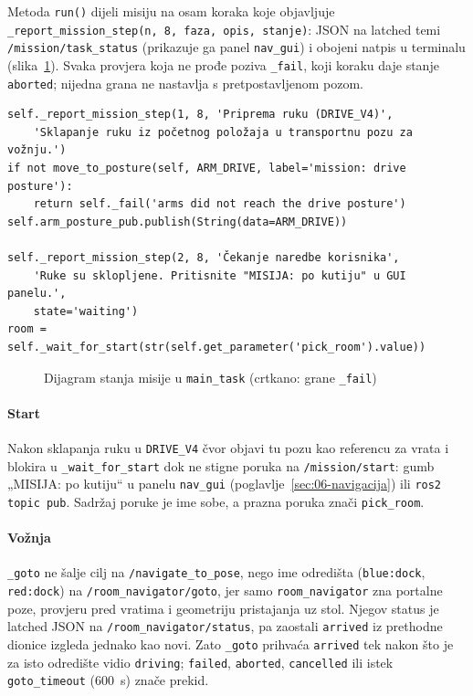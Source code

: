 Metoda \texttt{run()} dijeli misiju na osam koraka koje objavljuje \texttt{\_report\_mission\_step(n, 8,
faza, opis, stanje)}: JSON na latched temi \texttt{/mission/task\_status} (prikazuje ga panel
\texttt{nav\_gui}) i obojeni natpis u terminalu (slika~\ref{fig:mis-stanja}). Svaka provjera koja ne
prođe poziva \texttt{\_fail}, koji koraku daje stanje \texttt{aborted}; nijedna grana ne nastavlja s
pretpostavljenom pozom.

\begin{lstlisting}[style=code-python, caption={Prva dva od osam misijskih koraka (\texttt{main\_task.py}, redci 2915--2924): sklapanje ruku pa čekanje korisnika}, label={lst:misija-slijed}]
self._report_mission_step(1, 8, 'Priprema ruku (DRIVE_V4)',
    'Sklapanje ruku iz početnog položaja u transportnu pozu za vožnju.')
if not move_to_posture(self, ARM_DRIVE, label='mission: drive posture'):
    return self._fail('arms did not reach the drive posture')
self.arm_posture_pub.publish(String(data=ARM_DRIVE))

self._report_mission_step(2, 8, 'Čekanje naredbe korisnika',
    'Ruke su sklopljene. Pritisnite "MISIJA: po kutiju" u GUI panelu.',
    state='waiting')
room = self._wait_for_start(str(self.get_parameter('pick_room').value))
\end{lstlisting}

\begin{figure}[H]
  \centering
  
  \caption{Dijagram stanja misije u \texttt{main\_task} (crtkano: grane \texttt{\_fail})}
  \label{fig:mis-stanja}
\end{figure}

\paragraph{Start} Nakon sklapanja ruku u \texttt{DRIVE\_V4} čvor objavi tu pozu kao referencu za vrata i
blokira u \texttt{\_wait\_for\_start} dok ne stigne poruka na \texttt{/mission/start}: gumb „MISIJA: po
kutiju“ u panelu \texttt{nav\_gui} (poglavlje~\ref{sec:06-navigacija}) ili \texttt{ros2 topic pub}.
Sadržaj poruke je ime sobe, a prazna poruka znači \texttt{pick\_room}.

\paragraph{Vožnja} \texttt{\_goto} ne šalje cilj na \texttt{/navigate\_to\_pose}, nego ime odredišta
(\texttt{blue:dock}, \texttt{red:dock}) na \texttt{/room\_navigator/goto}, jer samo
\texttt{room\_navigator} zna portalne poze, provjeru pred vratima i geometriju pristajanja uz stol.
Njegov status je latched JSON na \texttt{/room\_navigator/status}, pa zaostali \texttt{arrived} iz
prethodne dionice izgleda jednako kao novi. Zato \texttt{\_goto} prihvaća \texttt{arrived} tek nakon što
je za isto odredište vidio \texttt{driving}; \texttt{failed}, \texttt{aborted}, \texttt{cancelled} ili
istek \texttt{goto\_timeout} (600~s) znače prekid.

